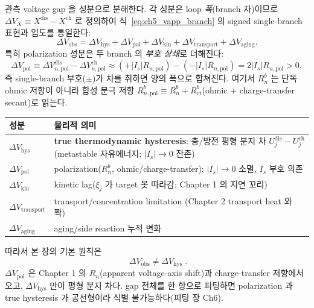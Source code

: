 \documentclass[11pt,a4paper]{article}
\newcommand{\transp}{\mathrm{transport}}
\newcommand{\dis}{\mathrm{dis}}
\newcommand{\chg}{\mathrm{ch}}
\newcommand{\hys}{\mathrm{hys}}
\newcommand{\pol}{\mathrm{pol}}
\newcommand{\kin}{\mathrm{kin}}
\newcommand{\obs}{\mathrm{obs}}
\newcommand{\ct}{\mathrm{ct}}
\begin{document}
관측 voltage gap 을 성분으로 분해한다. 각 성분은 loop \emph{폭}(branch 차)이므로 $\Delta V_X\equiv X^\dis-X^\chg$
로 정의하여 식~\eqref{eq:ch5_vapp_branch} 의 signed single-branch 표현과 입도를 통일한다:
\begin{equation}
\Delta V_\obs=\Delta V_\hys+\Delta V_\pol+\Delta V_\kin+\Delta V_\transp+\Delta V_{\mathrm{aging}}.
\label{eq:ch5_gap_decomp}
\end{equation}
특히 polarization 성분은 두 branch 의 \emph{부호 상쇄}로 더해진다:
\begin{equation}
\Delta V_\pol\equiv\Delta V_{n,\pol}^\dis-\Delta V_{n,\pol}^\chg
\approx(+|I_s|R_{n,\pol})-(-|I_s|R_{n,\pol})=2|I_s|R_{n,\pol}>0,
\label{eq:ch5_dvpol}
\end{equation}
즉 single-branch 부호($\pm$)가 차를 취하면 양의 폭으로 합쳐진다. 여기서 $R_n^b$ 는 단독 ohmic 저항이 아니라
합성 분극 저항 $R_{n,\pol}^b\equiv R_n^b+R_\ct^b$(ohmic $+$ charge-transfer secant)로 읽는다.
\begin{longtable}{p{} >{\raggedright\arraybackslash}p{}}
\toprule 성분 & 물리적 의미 \\ \midrule \endhead
$\Delta V_\hys$ & \textbf{true thermodynamic hysteresis}: 충/방전 평형 분지 차 $U_j^\dis-U_j^\chg$ (metastable 자유에너지; $|I_s|\to0$ 잔존) \\
$\Delta V_\pol$ & polarization($R_n^b$, ohmic/charge-transfer); $|I_s|\to0$ 소멸, $I_s$ 부호 의존 \\
$\Delta V_\kin$ & kinetic lag($\xi_j$ 가 target 못 따라감; Chapter 1 의 지연 꼬리) \\
$\Delta V_\transp$ & transport/concentration limitation (Chapter 2 transport heat 와 짝) \\
$\Delta V_{\mathrm{aging}}$ & aging/side reaction 누적 변화 \\
\bottomrule
\end{longtable}
따라서 본 장의 기본 원칙은
\begin{equation}
\boxed{\;\Delta V_\obs\ne\Delta V_\hys\;.}
\label{eq:ch5_obs_not_hys}
\end{equation}
$\Delta V_\pol$ 은 Chapter 1 의 $R_n$(apparent voltage-axis shift)과 charge-transfer 저항에서 오고,
$\Delta V_\hys$ 만이 평형 분지 차다. gap 전체를 한 항으로 피팅하면 polarization 과 true hysteresis 가 공선형이라
식별 불가능하다(피팅 장 Ch6).

\end{document}
